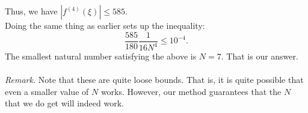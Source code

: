 \documentclass{article}
\begin{document}
Thus, we have $|f^{(4)}(\xi)| \le 585.$\\

Doing the same thing as earlier sets up the inequality:
\[\frac{585}{180}\frac{1}{16N^4} \le 10^{-4}.\]
The smallest natural number satisfying the above is $N = 7.$ That is our answer.\\~\\
\emph{Remark.} Note that these are quite loose bounds. That is, it is quite possible that even a smaller value of $N$ works. However, our method guarantees that the $N$ that we do get will indeed work.
\end{document}
